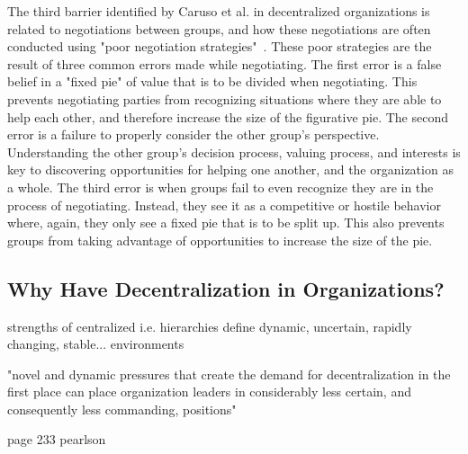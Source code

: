 The third barrier identified by Caruso et al. in decentralized organizations is related to negotiations between groups, and how these negotiations are often conducted using "poor negotiation  strategies"~\cite{caruso2008boundaries}. These poor strategies are the result of three common errors made while negotiating. The first error is a false belief in a "fixed pie" of value that is to be divided when negotiating. This prevents negotiating parties from recognizing situations where they are able to help each other, and therefore increase the size of the figurative pie. The second error is a failure to properly consider the other group's perspective. Understanding the other group's decision process, valuing process, and interests is key to discovering opportunities for helping one another, and the organization as a whole. The third error is when groups fail to even recognize they are in the process of negotiating. Instead, they see it as a competitive or hostile behavior where, again, they only see a fixed pie that is to be split up. This also prevents groups from taking advantage of opportunities to increase the size of the pie.    


\subsection{Why Have Decentralization in Organizations?}
strengths of centralized i.e. hierarchies
define dynamic, uncertain, rapidly changing, stable... environments

"novel and dynamic pressures that create the demand for decentralization in the first place can place organization leaders in considerably less certain, and consequently less commanding, positions"

page 233 pearlson